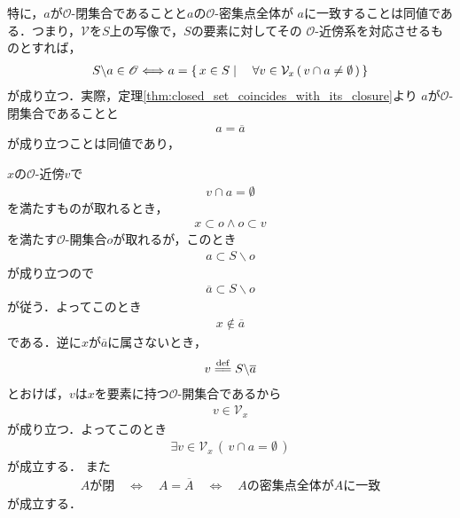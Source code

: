 	特に，$a$が$\mathscr{O}$-閉集合であることと$a$の$\mathscr{O}$-密集点全体が
	$a$に一致することは同値である．つまり，$\mathcal{V}$を$S$上の写像で，$S$の要素に対してその
	$\mathscr{O}$-近傍系を対応させるものとすれば，
	\begin{align}
		S \backslash a \in \mathscr{O} \Longleftrightarrow
		a = \left\{\, x \in S \mid \quad \forall v \in \mathcal{V}_{x}\, (\, v \cap a \neq \emptyset\, )\, \right\}
	\end{align}
	が成り立つ．実際，定理\ref{thm:closed_set_coincides_with_its_closure}より
	$a$が$\mathscr{O}$-閉集合であることと
	\begin{align}
		a = \overline{a}
	\end{align}
	が成り立つことは同値であり，
	
	\begin{sketch}
		$x$の$\mathscr{O}$-近傍$v$で
		\begin{align}
			v \cap a = \emptyset
		\end{align}
		を満たすものが取れるとき，
		\begin{align}
			x \subset o \wedge o \subset v
		\end{align}
		を満たす$\mathscr{O}$-開集合$o$が取れるが，このとき
		\begin{align}
			a \subset S \backslash o
		\end{align}
		が成り立つので
		\begin{align}
			\overline{a} \subset S \backslash o
		\end{align}
		が従う．よってこのとき
		\begin{align}
			x \notin \overline{a}
		\end{align}
		である．逆に$x$が$\overline{a}$に属さないとき，
		\begin{align}
			v \defeq S \backslash \overline{a}
		\end{align}
		とおけば，$v$は$x$を要素に持つ$\mathscr{O}$-開集合であるから
		\begin{align}
			v \in \mathcal{V}_{x}
		\end{align}
		が成り立つ．よってこのとき
		\begin{align}
			\exists v \in \mathcal{V}_{x}\, (\, v \cap a = \emptyset\, )
		\end{align}
		が成立する．
		\QED
		また
		\begin{align}
			\mbox{$A$が閉} \quad \Longleftrightarrow \quad A = \overline{A}
			\quad \Longleftrightarrow \quad
			\mbox{$A$の密集点全体が$A$に一致}
		\end{align}
		が成立する．
		\QED
	\end{sketch}
	
